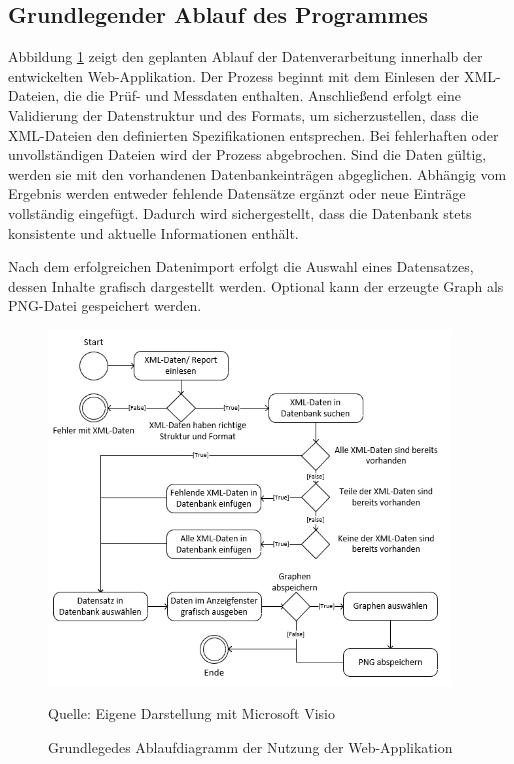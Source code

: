 \subsection{Grundlegender Ablauf des Programmes}
\label{subsec:grundlegender-ablauf-des-programmes}

Abbildung \ref{fig: Grundlegedes Ablaufdiagramm der Nutzung der Web-Applikation} zeigt den geplanten Ablauf der Datenverarbeitung innerhalb der entwickelten Web-Applikation.
Der Prozess beginnt mit dem Einlesen der XML-Dateien, die die Prüf- und Messdaten enthalten.
Anschließend erfolgt eine Validierung der Datenstruktur und des Formats, um sicherzustellen, dass die XML-Dateien den definierten Spezifikationen entsprechen.
Bei fehlerhaften oder unvollständigen Dateien wird der Prozess abgebrochen.
Sind die Daten gültig, werden sie mit den vorhandenen Datenbankeinträgen abgeglichen.
Abhängig vom Ergebnis werden entweder fehlende Datensätze ergänzt oder neue Einträge vollständig eingefügt.
Dadurch wird sichergestellt, dass die Datenbank stets konsistente und aktuelle Informationen enthält.


Nach dem erfolgreichen Datenimport erfolgt die Auswahl eines Datensatzes, dessen Inhalte grafisch dargestellt werden. Optional kann der erzeugte Graph als PNG-Datei gespeichert werden.



\begin{figure}[H]
    \centering
    \includegraphics[width=0.95\textwidth]{Grafiken/Ablaufdiagramm}
    \caption{Grundlegedes Ablaufdiagramm der Nutzung der Web-Applikation}
    \label{fig: Grundlegedes Ablaufdiagramm der Nutzung der Web-Applikation}
    {Quelle: Eigene Darstellung mit Microsoft Visio}
\end{figure}
